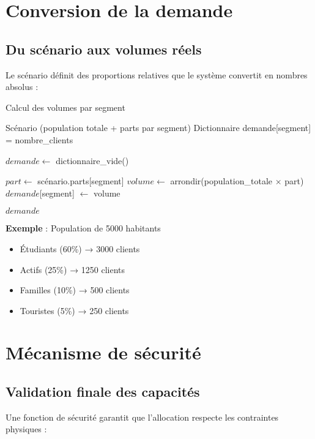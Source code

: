 \documentclass[12pt,a4paper]{article}
\begin{document}
\section{Conversion de la demande}

\subsection{Du scénario aux volumes réels}

Le scénario définit des proportions relatives que le système convertit en nombres absolus :

\begin{algorithm}[H]
\caption{Calcul des volumes par segment}
\begin{algorithmic}[1]
\REQUIRE Scénario (population totale + parts par segment)
\ENSURE Dictionnaire demande[segment] = nombre\_clients

\STATE $demande \leftarrow$ dictionnaire\_vide()

    \STATE $part \leftarrow$ scénario.parts[segment]
    \STATE $volume \leftarrow$ arrondir(population\_totale $\times$ part)
    \STATE $demande$[segment] $\leftarrow$ volume
\ENDFOR

\RETURN $demande$
\end{algorithmic}
\end{algorithm}

\textbf{Exemple} : Population de 5000 habitants
\begin{itemize}
    \item Étudiants (60\%) → 3000 clients
    \item Actifs (25\%) → 1250 clients
    \item Familles (10\%) → 500 clients
    \item Touristes (5\%) → 250 clients
\end{itemize}

\section{Mécanisme de sécurité}

\subsection{Validation finale des capacités}

Une fonction de sécurité garantit que l'allocation respecte les contraintes physiques :
\end{document}

